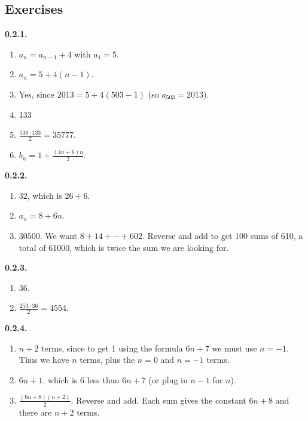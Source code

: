 \documentclass[10pt,]{book}
\theoremstyle{plain}
\theoremstyle{definition}
\theoremstyle{definition}
\theoremstyle{definition}
\theoremstyle{definition}
\numberwithin{equation}{chapter}
\begin{document}
\subsection*{ Exercises}
\noindent\textbf{0.2.1.} \hypertarget{p-181}{}%
\leavevmode%
\begin{enumerate}[label=(\alph*)]
\item\hypertarget{li-103}{}\(a_n = a_{n-1} + 4\) with \(a_1 = 5\).%
\item\hypertarget{li-104}{}\(a_n = 5 + 4(n-1)\).%
\item\hypertarget{li-105}{}\hypertarget{p-182}{}%
Yes, since \(2013 = 5 + 4(503-1)\) (so \(a_{503} = 2013\)).%
\item\hypertarget{li-106}{}\hypertarget{p-183}{}%
133%
\item\hypertarget{li-107}{}\(\frac{538\cdot 133}{2} = 35777\).%
\item\hypertarget{li-108}{}\(b_n = 1 + \frac{(4n+6)n}{2}\).%
\end{enumerate}
%
\par\smallskip
\noindent\textbf{0.2.2.} \hypertarget{p-189}{}%
\leavevmode%
\begin{enumerate}[label=(\alph*)]
\item\hypertarget{li-112}{}\hypertarget{p-190}{}%
\(32\), which is \(26+6\).%
\item\hypertarget{li-113}{}\(a_n = 8 + 6n\).%
\item\hypertarget{li-114}{}\(30500\).  We want \(8 + 14 + \cdots + 602\).  Reverse and add to get 100 sums of 610, a total of 61000, which is twice the sum we are looking for.%
\end{enumerate}
%
\par\smallskip
\noindent\textbf{0.2.3.} \hypertarget{p-195}{}%
\leavevmode%
\begin{enumerate}[label=(\alph*)]
\item\hypertarget{li-117}{}\hypertarget{p-196}{}%
36.%
\item\hypertarget{li-118}{}\(\frac{253 \cdot 36}{2} = 4554\).%
\end{enumerate}
%
\par\smallskip
\noindent\textbf{0.2.4.} \hypertarget{p-202}{}%
\leavevmode%
\begin{enumerate}[label=(\alph*)]
\item\hypertarget{li-122}{}\(n+2\) terms, since to get 1 using the formula \(6n+7\) we must use \(n=-1\).  Thus we have \(n\) terms, plus the \(n=0\) and \(n=-1\) terms.%
\item\hypertarget{li-123}{}\(6n+1\), which is 6 less than \(6n+7\) (or plug in \(n-1\) for \(n\)).%
\item\hypertarget{li-124}{}\(\frac{(6n+8)(n+2)}{2}\).  Reverse and add.  Each sum gives the constant \(6n+8\) and there are \(n+2\) terms.%
\end{enumerate}
\end{document}
